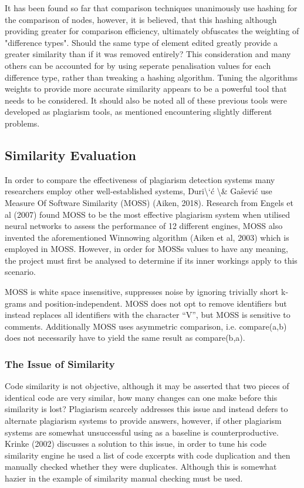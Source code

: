 \documentclass[jou,apacite]{apa6}
\begin{document}
It has been found so far that comparison techniques unanimously use hashing for the comparison of nodes, however, it is believed, that this hashing although providing greater for comparison efficiency, ultimately obfuscates the weighting of "difference types". Should the same type of element edited greatly provide a greater similarity than if it was removed entirely? This consideration and many others can be accounted for by using seperate penalisation values for each difference type, rather than tweaking a hashing algorithm. Tuning the algorithms weights to provide more accurate similarity appears to be a powerful tool that needs to be considered. It should also be noted all of these previous tools were developed as plagiarism tools, as mentioned encountering slightly different problems. 
\subsection{Similarity Evaluation}

In order to compare the effectiveness of plagiarism detection systems many researchers employ other well-established systems, Duri\textbackslash{}`\'{c} \textbackslash{}\& Ga\v{s}evi\'{c} use Measure Of Software Similarity (MOSS) (Aiken, 2018). Research from Engels et al (2007) found MOSS to be the most effective plagiarism system when utilised neural networks to assess the performance of 12 different engines, MOSS also invented the aforementioned Winnowing algorithm (Aiken et al, 2003) which is employed in MOSS. However, in order for MOSS\textquotesingle s values to have any meaning, the project must first be analysed to determine if it\textquotesingle s inner workings apply to this scenario.

MOSS is white space insensitive, suppresses noise by ignoring trivially short k-grams and position-independent. MOSS does not opt to remove identifiers but instead replaces all identifiers with the character \textquotedblleft{}V\textquotedblright{}, but MOSS is sensitive to comments. Additionally MOSS uses asymmetric comparison, i.e. compare(a,b) does not necessarily have to yield the same result as compare(b,a). 

\subsubsection{The Issue of Similarity}
Code similarity is not objective, although it may be asserted that two pieces of identical code are very similar, how many changes can one make before this similarity is lost? Plagiarism scarcely addresses this issue and instead defers to alternate plagiarism systems to provide answers, however, if other plagiarism systems are somewhat unsuccessful using as  a baseline is counterproductive. Krinke (2002) discusses a solution to this issue, in order to tune his code similarity engine he used a list of code excerpts with code duplication and then manually checked whether they were duplicates. Although this is somewhat hazier in the example of similarity manual checking must be used.
\end{document}
